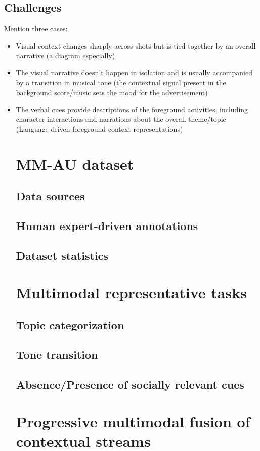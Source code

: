 \subsection{Challenges}
Mention three cases:
\begin{itemize}
\item Visual context changes sharply across shots but is tied together by an overall narrative (a diagram especially)
\item The visual narrative doesn’t happen in isolation and is usually accompanied by a transition in musical tone (the contextual signal present in the background score/music sets the mood for the advertisement)
\item The verbal cues provide descriptions of the foreground activities, including character interactions and narrations about the overall theme/topic (Language driven foreground context representations)
\section{MM-AU dataset}
\subsection{Data sources}
\subsection{Human expert-driven annotations}
\subsection{Dataset statistics}
\section{Multimodal representative tasks}
\subsection{Topic categorization}
\subsection{Tone transition}
\subsection{Absence/Presence of socially relevant cues}
\section{Progressive multimodal fusion of contextual streams}

\end{itemize}
